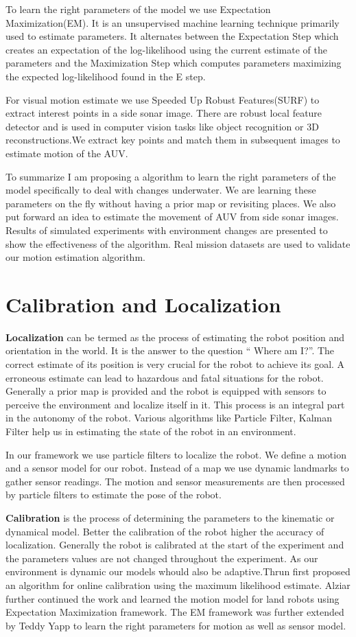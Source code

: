 \documentclass[12pt]{dalcsthesis}
\begin{document}
To learn the right parameters of the model we use Expectation Maximization(EM). It is an unsupervised machine learning technique primarily used to estimate parameters. It alternates between the Expectation Step which creates an expectation of the log-likelihood using the current estimate of the parameters and the Maximization Step which computes parameters maximizing the expected log-likelihood found in the E step. 

For visual motion estimate we use Speeded Up Robust Features(SURF) to extract interest points in a side sonar image. There are robust local feature detector and is used in computer vision tasks like object recognition or 3D reconstructions.We extract key points and match them in subsequent images to estimate motion of the AUV.

To summarize I am proposing a algorithm to learn the right parameters of the model specifically to deal with changes underwater. We are learning these parameters on the fly without having a prior map or revisiting places. We also put forward an idea to estimate the movement of AUV from side sonar images. Results of simulated experiments with environment changes are presented to show the effectiveness of the algorithm. Real mission datasets are used to validate our motion estimation algorithm. 
\section{Calibration and Localization}
\textbf{Localization} can be termed as the process of estimating the robot position and orientation in the world. It is the answer to the question “ Where am I?”. The correct estimate of its position is very crucial for the robot to achieve its goal. A erroneous estimate can lead to hazardous and fatal situations for the robot. Generally a prior map is provided and the robot is equipped with sensors to perceive the environment and localize itself in it. This process is an integral part in the autonomy of the robot. Various algorithms like Particle Filter, Kalman Filter help us in estimating the state of the robot in an environment. 

In our framework we use particle filters to localize the robot. We define a motion and a sensor model for our robot. Instead of a map we use dynamic landmarks to gather sensor readings. The motion and sensor measurements are then processed by particle filters to estimate the pose of the robot. 

\textbf{Calibration} is the process of determining the parameters to the kinematic or dynamical model. Better the calibration of the robot higher the accuracy of localization. Generally the robot is calibrated at the start of the experiment and the parameters values are not changed throughout the experiment. As our environment is dynamic our models whould also be adaptive.Thrun first proposed an algorithm for online calibration using the maximum likelihood estimate. Alziar further continued the work and learned the motion model for land robots using Expectation Maximization framework. The EM framework was further extended by Teddy Yapp to learn the right parameters for motion as well as sensor model. 
\end{document}
